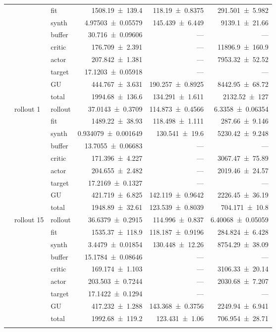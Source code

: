 {\begin{longtable}{@{}lllrrr@{}}
     &  & fit & \num{1508.19+-139.4} & \num{118.19+-0.8375} & \num{291.501+-5.982} \\
     &  & synth & \num{4.97503+-0.05579} & \num{145.439+-6.449} & \num{9139.1+-21.66} \\
     &  & buffer & \num{30.716+-0.09606} & --- & --- \\
     &  & critic & \num{176.709+-2.391} & --- & \num{11896.9+-160.9} \\
     &  & actor & \num{207.842+-1.381} & --- & \num{7953.32+-52.52} \\
     &  & target & \num{17.1203+-0.05918} & --- & --- \\
     &  & GU & \num{444.767+-3.631} & \num{190.257+-0.8925} & \num{8442.95+-68.72} \\
     &  & total & \num{1994.68+-136.6} & \num{134.291+-1.611} & \num{2132.52+-127} \\
    \addlinespace[2pt]
     & rollout 1 & rollout & \num{37.0143+-0.3709} & \num{114.873+-0.4566} & \num{6.3358+-0.06354} \\
     &  & fit & \num{1489.22+-38.93} & \num{118.498+-1.111} & \num{287.66+-9.146} \\
     &  & synth & \num{0.934079+-0.001649} & \num{130.541+-19.6} & \num{5230.42+-9.248} \\
     &  & buffer & \num{13.7055+-0.06683} & --- & --- \\
     &  & critic & \num{171.396+-4.227} & --- & \num{3067.47+-75.89} \\
     &  & actor & \num{204.655+-2.482} & --- & \num{2019.46+-24.57} \\
     &  & target & \num{17.2169+-0.1327} & --- & --- \\
     &  & GU & \num{421.719+-6.825} & \num{142.119+-0.9642} & \num{2226.45+-36.19} \\
     &  & total & \num{1948.89+-32.61} & \num{123.539+-0.8039} & \num{704.171+-10.8} \\
    \addlinespace[2pt]
     & rollout 15 & rollout & \num{36.6379+-0.2915} & \num{114.996+-0.837} & \num{6.40068+-0.05059} \\
     &  & fit & \num{1535.37+-118.9} & \num{118.187+-0.9196} & \num{284.824+-6.428} \\
     &  & synth & \num{3.4479+-0.01854} & \num{130.448+-12.26} & \num{8754.29+-38.09} \\
     &  & buffer & \num{15.1784+-0.08646} & --- & --- \\
     &  & critic & \num{169.174+-1.103} & --- & \num{3106.33+-20.14} \\
     &  & actor & \num{203.503+-0.7244} & --- & \num{2030.68+-7.207} \\
     &  & target & \num{17.1422+-0.1294} & --- & --- \\
     &  & GU & \num{417.232+-1.288} & \num{143.368+-0.3756} & \num{2249.94+-6.941} \\
     &  & total & \num{1992.68+-119.2} & \num{123.431+-1.06} & \num{706.954+-28.71} \\
    \addlinespace[2pt]
  \end{longtable}
}
